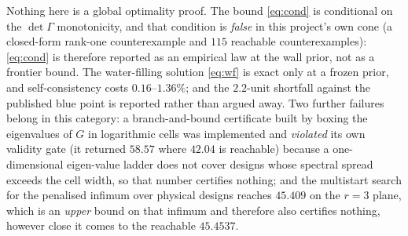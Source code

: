 \begin{remark}
\label{rmk:notclaimed}
Nothing here is a global optimality proof. The bound \eqref{eq:cond} is
conditional on the $\det\Gamma$ monotonicity, and that condition is \emph{false}
in this project's own cone (a closed-form rank-one counterexample and $115$
reachable counterexamples): \eqref{eq:cond} is therefore reported as an empirical
law at the wall prior, not as a frontier bound. The water-filling solution
\eqref{eq:wf} is exact only at a frozen prior, and self-consistency costs
$0.16$--$1.36\%$; and the $2.2$-unit shortfall against the published blue point
is reported rather than argued away. Two further failures belong in this
category: a branch-and-bound certificate built by boxing the eigenvalues of $G$
in logarithmic cells was implemented and \emph{violated} its own validity gate
(it returned $58.57$ where $42.04$ is reachable) because a one-dimensional
eigen-value ladder does not cover designs whose spectral spread exceeds the cell
width, so that number certifies nothing; and the multistart search for the
penalised infimum over physical designs reaches $45.409$ on the $r=3$ plane,
which is an \emph{upper} bound on that infimum and therefore also certifies
nothing, however close it comes to the reachable $45.4537$.

\end{remark}
